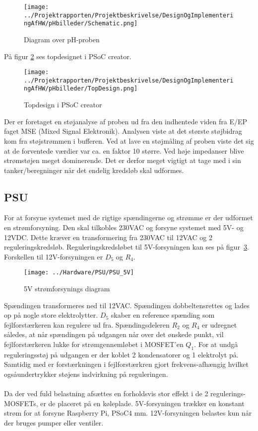 \begin{figure}[H]
	\centering 
	\texttt{[image: ../Projektrapporten/Projektbeskrivelse/DesignOgImplementeringAfHW/pHbilleder/Schematic.png]}
	\caption{Diagram over pH-proben}
	\label{photo:Schematic_ph}
\end{figure} 
På figur \ref{photo:PSoC_Creator_ph} ses topdesignet i PSoC creator.
\begin{figure}[H]
	\centering 
	\texttt{[image: ../Projektrapporten/Projektbeskrivelse/DesignOgImplementeringAfHW/pHbilleder/TopDesign.png]}
	\caption{Topdesign i PSoC creator}
	\label{photo:PSoC_Creator_ph}
\end{figure} 
Der er foretaget en støjanalyse af proben ud fra den indhentede viden fra E/EP faget MSE (Mixed Signal Elektronik). Analysen viste at det største støjbidrag kom fra støjstrømmen i bufferen. Ved at lave en støjmåling af proben viste det sig at de forventede værdier var ca. en faktor 10 større. Ved høje impedanser blive strømstøjen meget dominerende. Det er derfor meget vigtigt at tage med i sin tanker/beregninger når det endelig kredsløb skal udformes.

\subsection{PSU}
For at forsyne systemet med de rigtige spændingerne og strømme er der udformet en strømforsyning. Den skal tilkobles 230VAC og forsyne systemet med 5V- og 12VDC. Dette kræver en transformering fra 230VAC til 12VAC og 2 reguleringskredsløb. Reguleringskredsløbet til 5V-forsyningen kan ses på figur~\ref{photo:PSU_5V}. Forskellen til 12V-forsyningen er $D_5$ og $R_4$.
 
\begin{figure}[H]
	\centering
	\texttt{[image: ../Hardware/PSU/PSU\_5V]}
	\caption{5V strømforsynings diagram}
	\label{photo:PSU_5V}
\end{figure}

Spændingen transformeres ned til 12VAC. Spændingen dobbeltensrettes og lades op på nogle store elektrolytter. $D_5$ skaber en reference spænding som fejlforstærkeren kan regulere ud fra. Spændingsdeleren $R_2$ og $R_4$ er udregnet således, at når spændingen på udgangen når over det ønskede punkt, vil fejlforstærkeren lukke for strømgennemløbet i MOSFET'en $Q_1$. For at undgå reguleringsstøj på udgangen er der koblet 2 kondensatorer og 1 elektrolyt på. Samtidig med er forstærkningen i fejlforstærkren gjort frekvens-afhængig hvilket ogsåundertrykker støjens indvirkning på reguleringen.
\\\\
Da der ved fuld belastning afsættes en forholdsvis stor effekt i de 2 regulerings-MOSFETs, er de placeret på en køleplade. 5V-forsyningen trækker en konstant strøm for at forsyne Raspberry Pi, PSoC4 mm. 12V-forsyningen belastes kun når der bruges pumper eller ventiler.

